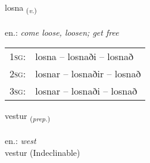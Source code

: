 \documentclass[frontgrid, backgrid]{flacards}\usepackage[]{graphicx}\usepackage[]{xcolor}
\begin{document}
\renewcommand{\blhead}{\vskip5pt {\small\bfseries\footnotesize Sagnorð | Verb }}
\renewcommand{\bcfoot}{\vskip5pt \hspace{2pt}{\small\bfseries\footnotesize 2K}}


{losna \small{\textsubscript{(\textit{v.})}} \\[1ex] %
\textphonetic{[lɔstna]} \\
en.: \emph{come loose, loosen; get free} \\  [2ex]
\renewcommand*{\arraystretch}{0.8}
\begin{tabular}{p{1cm}l}
\textsc{1sg}: & losna -- losnaði -- losnað \\ 
\textsc{2sg}: & losnar -- losnaðir -- losnað \\ 
\textsc{3sg}: & losnar -- losnaði -- losnað \\ 
\end{tabular}
}


\renewcommand{\flhead}{\vskip5pt \fboxsep=0pt {\small\bfseries\footnotesize Forsetning | Preposition}}
\renewcommand{\fcfoot}{\vskip5pt \fboxsep=0pt \hspace{2pt}{\small\bfseries\footnotesize 2K}}

\renewcommand{\blhead}{\vskip5pt {\small\bfseries\footnotesize Forsetning | Preposition }}
\renewcommand{\bcfoot}{\vskip5pt \hspace{2pt}{\small\bfseries\footnotesize 2K}}


{vestur \small{\textsubscript{(\textit{prep.})}} \\[1ex]
\textphonetic{[vɛstʏr]} \\
en.: \emph{west} \\  [2ex]
vestur (Indeclinable)}


\renewcommand{\flhead}{\vskip5pt \fboxsep=0pt {\small\bfseries\footnotesize Forsetning | Preposition}}
\renewcommand{\fcfoot}{\vskip5pt \fboxsep=0pt \hspace{2pt}{\small\bfseries\footnotesize 2K}}
\end{document}
